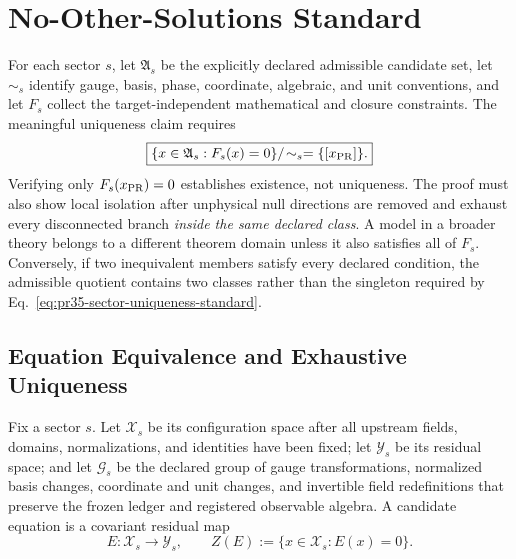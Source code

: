 \section{No-Other-Solutions Standard}
\label{sec:pr35-no-other-solutions-standard}

For each sector $s$, let \(\mathfrak A_s\) be the explicitly declared
admissible candidate set, let \(\sim_s\) identify gauge, basis, phase,
coordinate, algebraic, and unit conventions, and let \(F_s\) collect the
target-independent mathematical and closure constraints.  The meaningful
uniqueness claim requires
\begin{equation}
\boxed{
\{x\in\mathfrak A_s:F_s(x)=0\}/\!\sim_s
=
\{[x_{\rm PR}]\}.}
\label{eq:pr35-sector-uniqueness-standard}
\end{equation}
Verifying only \(F_s(x_{\rm PR})=0\) establishes existence, not uniqueness.
The proof must also show local isolation after unphysical null directions are
removed and exhaust every disconnected branch \emph{inside the same declared
class}.  A model in a broader theory belongs to a different theorem domain
unless it also satisfies all of \(F_s\).  Conversely, if two inequivalent
members satisfy every declared condition, the admissible quotient contains two
classes rather than the singleton required by
Eq.~\eqref{eq:pr35-sector-uniqueness-standard}.

\subsection{Equation Equivalence and Exhaustive Uniqueness}
\label{subsec:pr35-equation-equivalence}

Fix a sector $s$.  Let $\mathcal X_s$ be its configuration space after all
upstream fields, domains, normalizations, and identities have been fixed; let
$\mathcal Y_s$ be its residual space; and let $\mathcal G_s$ be the declared
group of gauge transformations, normalized basis changes, coordinate and unit
changes, and invertible field redefinitions that preserve the frozen ledger
and registered observable algebra.  A candidate equation is a covariant
residual map
\begin{equation}
 E:\mathcal X_s\longrightarrow\mathcal Y_s,
 \qquad
 Z(E):=\{x\in\mathcal X_s:E(x)=0\}.
 \label{eq:pr35-equation-zero-set}
\end{equation}


